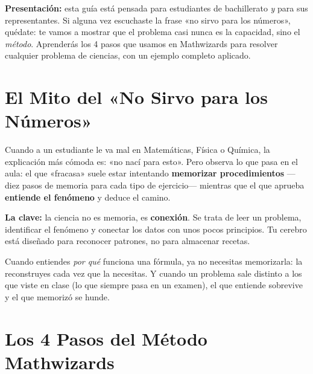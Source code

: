 \documentclass[12pt, letterpaper]{article}
\begin{document}

\vspace{6pt}
\begin{cuadroinfo}
  \small
  \textbf{Presentación:} esta guía está pensada para estudiantes de bachillerato \emph{y} para sus representantes. Si alguna vez escuchaste la frase «no sirvo para los números», quédate: te vamos a mostrar que el problema casi nunca es la capacidad, sino el \emph{método}. Aprenderás los 4 pasos que usamos en Mathwizards para resolver cualquier problema de ciencias, con un ejemplo completo aplicado.
\end{cuadroinfo}

\section{El Mito del «No Sirvo para los Números»}

Cuando a un estudiante le va mal en Matemáticas, Física o Química, la explicación más cómoda es: «no nací para esto». Pero observa lo que pasa en el aula: el que «fracasa» suele estar intentando \textbf{memorizar procedimientos} —diez pasos de memoria para cada tipo de ejercicio— mientras que el que aprueba \textbf{entiende el fenómeno} y deduce el camino.

\begin{cuadroteoria}
  \textbf{La clave:} la ciencia no es memoria, es \textbf{conexión}. Se trata de leer un problema, identificar el fenómeno y conectar los datos con unos pocos principios. Tu cerebro está diseñado para reconocer patrones, no para almacenar recetas.
\end{cuadroteoria}

\noindent Cuando entiendes \emph{por qué} funciona una fórmula, ya no necesitas memorizarla: la reconstruyes cada vez que la necesitas. Y cuando un problema sale distinto a los que viste en clase (lo que siempre pasa en un examen), el que entiende sobrevive y el que memorizó se hunde.

\section{Los 4 Pasos del Método Mathwizards}
\end{document}

